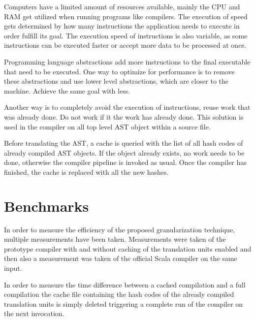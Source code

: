 \documentclass{VUMIFPSbakalaurinis}
\begin{document}
Computers have a limited amount of resources available, mainly the CPU and RAM get utilized when running programs like compilers.
The execution of speed gets determined by how many instructions the application needs to execute in order fulfill its goal.
The execution speed of instructions is also variable, as some instructions can be executed faster or accept more data to be processed at once.

Programming language abstractions add more instructions to the final executable that need to be executed.
One way to optimize for performance is to remove these abstractions and use lower level abstractions, which are closer to the machine.
Achieve the same goal with less.%

Another way is to completely avoid the execution of instructions, reuse work that was already done.
Do not work if it the work has already done.
This solution is used in the compiler on all top level AST object within a source file.

Before translating the AST, a cache is queried with the list of all hash codes of already compiled AST objects.
If the object already exists, no work needs to be done, otherwise the compiler pipeline is invoked as usual.
Once the compiler has finished, the cache is replaced with all the new hashes.

\section{Benchmarks}
In order to measure the efficiency of the proposed granularization technique, multiple measurements have been taken.
Measurements were taken of the prototype compiler with and without caching of the translation units enabled and then also a measurement was taken of the official Scala compiler on the same input.

In order to measure the time difference between a cached compilation and a full compilation the cache file containing the hash codes of the already compiled translation units is simply deleted triggering a complete run of the compiler on the next invocation.

\end{document}
